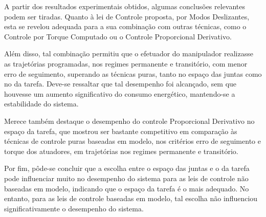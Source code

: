 \documentclass[]{politex}
\begin{document}



A partir dos resultados experimentais obtidos, algumas conclusões relevantes podem ser tiradas. Quanto à lei de Controle proposta, por Modos Deslizantes, esta se revelou adequada para a sua combinação com outras técnicas, como o Controle por Torque Computado ou o Controle Proporcional Derivativo. 

Além disso, tal combinação permitiu que o efetuador do manipulador realizasse as trajetórias programadas, nos regimes permanente e transitório, com menor erro de seguimento, superando as técnicas puras, tanto no espaço das juntas como no da tarefa. Deve-se ressaltar que tal desempenho foi alcançado, sem que houvesse um aumento significativo do consumo energético, mantendo-se a estabilidade do sistema.

Merece também destaque o desempenho do controle Proporcional Derivativo no espaço da tarefa, que mostrou ser bastante competitivo em comparação às técnicas de controle puras baseadas em modelo, nos critérios erro de seguimento e torque dos atuadores, em trajetórias nos regimes permanente e transitório. 

Por fim, pôde-se concluir que a escolha entre o espaço das juntas e o da tarefa pode influenciar muito no desempenho do sistema para as leis de controle não baseadas em modelo, indicando que o espaço da tarefa é o mais adequado. No entanto, para as leis de controle baseadas em modelo, tal escolha não influenciou significativamente o desempenho do sistema.
\end{document}
